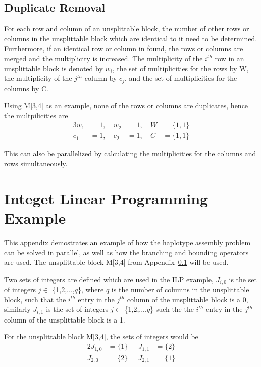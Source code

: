 \documentclass[10pt,twocolumn]{article}
\begin{document}
\subsection{Duplicate Removal} \label{app:duprem}

For each row and column of an unsplittable block, the number of other rows or columns in the unsplittable
block which are identical to it need to be determined. Furthermore, if an identical row or column in found,
the rows or columns are merged and the multiplicity is increased. The multiplicity of the $i^{th}$ row in an
unsplittable block is denoted by $w_i$, the set of multiplicities for the rows by W, the multiplicity of the
$j^{th}$ column by $c_j$, and the set of multiplicities for the columns by C.

Using M[3,4] as an example, none of the rows or columns are duplicates, hence the multpilicities are
\begin{alignat*}{3}
    w_1 &= 1, & \ w_2 &= 1, & \ W &= \{1, 1\} \\
    c_1 &= 1, & \ c_2 &= 1, & \ C &= \{1, 1\}
\end{alignat*}

This can also be parallelized by calculating the multiplicities for the columns and rows simultaneously.

\section{Integet Linear Programming Example} \label{app:ilpex}

This appendix demostrates an example of how the haplotype assembly problem can be solved in parallel, as well
as how the branching and bounding operators are used. The unsplittable block M[3,4] from 
Appendix~\ref{app:duprem} will be used.

Two sets of integers are defined which are used in the ILP example, $J_{i,0}$ is the set of integers $j \in$
\{1,2,...,$q$\}, where $q$ is the number of columns in the unsplittable block, such that the $i^{th}$ entry in
the $j^{th}$ column of the unsplittable block is a 0, similarly $J_{i,1}$ is the set of integers $j \in$
\{1,2,...,$q$\} such the the $i^{th}$ entry in the $j^{th}$ column of the unsplittable block is a 1. 

For the unsplittable block M[3,4], the sets of integers would be 
\begin{alignat*}{2}
    J_{1,0} &= \{1\}     & \ \ \  J_{1,1} &= \{2\}        \\
    J_{2,0} &= \{2\}     & \ \ \  J_{2,1} &= \{1\}   
\end{alignat*}
\end{document}
